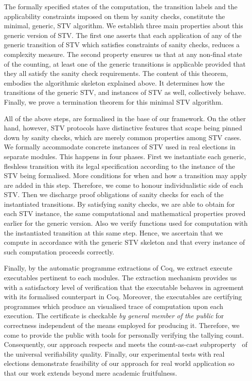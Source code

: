 \documentclass{llncs}
\begin{document}
The formally specified states of the computation, the transition
labels and the applicability constraints imposed on them by sanity
checks, constitute the minimal, generic, STV algorithm. We establish
three  main properties about this generic version of STV. The first
one asserts that each application of any of the generic transition
of STV which satisfies constraints of sanity checks, reduces a
complexity measure. The second property ensures us that at any
non-final state of the counting, at least one of the generic
transitions is applicable provided that they all satisfy the sanity
check requirements. The content of this theorem, embodies the
algorithmic skeleton explained above. It determines how the
transitions of the generic STV, and instances of STV as well,
collectively behave. Finally, we prove a termination theorem for
this minimal STV algorithm.


 All of the above steps, are formalised in the base of our
 framework. On the other hand, however, STV protocols have
 distinctive features that scape being pinned down by sanity checks,
 which are merely common properties among STV cases. We formally
 accommodate concrete instances of STV used in real elections in
 separate modules.  This happens in four phases.  First we
 instantiate each generic, fleshless transition with its legal
 specification according to the instance of the STV being
 formalised. More conditions for when and how a transition may apply
 are added in this step. Therefore, we come to honour
 individualistic side of each STV. Then we discharge proof
 obligations of sanity checks for each of the instantiated
 transitions. By satisfying sanity checks, we are able to obtain for
 each STV instance, the same computational and mathematical
 properties proved earlier for the generic version. Also we verify
 functions used for computation with the instantiated transition at
 this same step. Hence, we ascertain that we compute in accordance
 with the generic STV skeleton and that every instance of such
 computation proceeds correctly.
 
 
Finally, by the automatic programme extractions of Coq, we extract execute executables pertinent to each modules. The extraction mechanism provides us with a satisfactory level of verification that the executable behaves in agreement with its formalised counterpart in Coq. Moreover, the executables are certifying programmes which produce an visualised trace of computation upon each execution. The certificate is checkable \emph{by general member of the public} for correctness independent of the means employed for producing it. Therefore, we come to provide the public with tools for personally verifying the tallying count. Consequently, our approach respects and meets the count-as-cast subproperty~\cite{DBLP:journals/iacr/CortierGKMT16} of the universal verifiability quality. Finally, our experimental tests with real elections demonstrate feasibility of our approach for  real world application so that our work extends beyond mere academic fruitfulness. 
 
\end{document}

